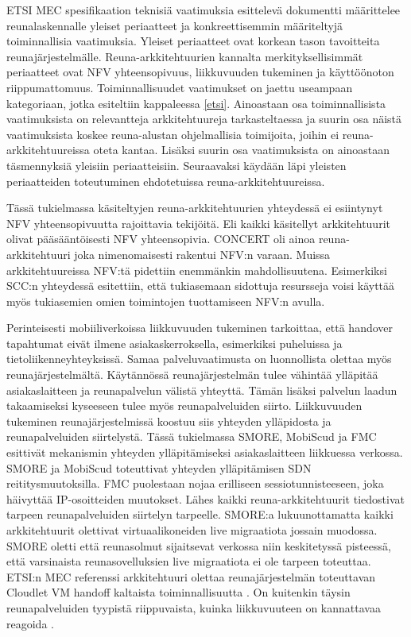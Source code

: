 ETSI MEC spesifikaation teknisiä vaatimuksia esittelevä dokumentti \cite{etsitechreq} määrittelee reunalaskennalle yleiset periaatteet ja konkreettisemmin määriteltyjä toiminnallisia vaatimuksia. 
Yleiset periaatteet ovat korkean tason tavoitteita reunajärjestelmälle.
Reuna-arkkitehtuurien kannalta merkityksellisimmät periaatteet ovat NFV yhteensopivuus, liikkuvuuden tukeminen ja käyttöönoton riippumattomuus.
Toiminnallisuudet vaatimukset on jaettu useampaan kategoriaan, jotka esiteltiin kappaleessa \ref{etsi}.
Ainoastaan osa toiminnallisista vaatimuksista on relevantteja arkkitehtuureja tarkasteltaessa ja suurin osa näistä vaatimuksista koskee reuna-alustan ohjelmallisia toimijoita, joihin ei reuna-arkkitehtuureissa oteta kantaa.
Lisäksi suurin osa vaatimuksista on ainoastaan täsmennyksiä yleisiin periaatteisiin.
Seuraavaksi käydään läpi yleisten periaatteiden toteutuminen ehdotetuissa reuna-arkkitehtuureissa.

Tässä tukielmassa käsiteltyjen reuna-arkkitehtuurien yhteydessä ei esiintynyt NFV yhteensopivuutta rajoittavia tekijöitä. Eli kaikki käsitellyt arkkitehtuurit olivat pääsääntöisesti NFV yhteensopivia.
CONCERT oli ainoa reuna-arkkitehtuuri joka nimenomaisesti rakentui NFV:n varaan. Muissa arkkitehtuureissa NFV:tä pidettiin enemmänkin mahdollisuutena.
Esimerkiksi SCC:n yhteydessä esitettiin, että tukiasemaan sidottuja resursseja voisi käyttää myös tukiasemien omien toimintojen tuottamiseen NFV:n avulla. 


Perinteisesti mobiiliverkoissa liikkuvuuden tukeminen tarkoittaa, että handover tapahtumat eivät ilmene asiakaskerroksella, esimerkiksi puheluissa ja tietoliikenneyhteyksissä.
Samaa palveluvaatimusta on luonnollista olettaa myös reunajärjestelmältä. 
Käytännössä reunajärjestelmän tulee vähintää ylläpitää asiakaslaitteen ja reunapalvelun välistä yhteyttä.
Tämän lisäksi palvelun laadun takaamiseksi kyseeseen tulee myös reunapalveluiden siirto.
Liikkuvuuden tukeminen reunajärjestelmissä koostuu siis yhteyden ylläpidosta ja reunapalveluiden siirtelystä.
Tässä tukielmassa SMORE, MobiScud ja FMC esittivät mekanismin yhteyden ylläpitämiseksi asiakaslaitteen liikkuessa verkossa.
SMORE ja MobiScud toteuttivat yhteyden ylläpitämisen SDN reititysmuutoksilla.
FMC puolestaan nojaa erilliseen sessiotunnisteeseen, joka häivyttää IP-osoitteiden muutokset.
Lähes kaikki reuna-arkkitehtuurit tiedostivat tarpeen reunapalveluiden siirtelyn tarpeelle.
SMORE:a lukuunottamatta kaikki arkkitehtuurit olettivat virtuaalikoneiden live migraatiota jossain muodossa. SMORE oletti että reunasolmut sijaitsevat verkossa niin keskitetyssä pisteessä, että varsinaista reunasovelluksien live migraatiota ei ole tarpeen toteuttaa. 
ETSI:n MEC referenssi arkkitehtuuri olettaa reunajärjestelmän toteuttavan Cloudlet VM handoff kaltaista toiminnallisuutta \cite{etsirefarch}.
On kuitenkin täysin reunapalveluiden tyypistä riippuvaista, kuinka liikkuvuuteen on kannattavaa reagoida \cite{etsitechreq}. 

